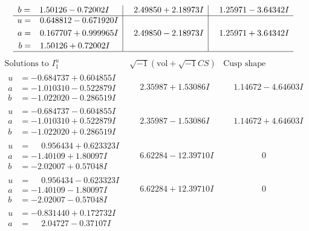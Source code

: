 \documentclass[1p]{elsarticle_modified}
\theoremstyle{definition}
\newcommand{\I}{\sqrt{-1}}
\begin{document}
$$\begin{array}{c|c|c}
\begin{aligned}
b &= \phantom{-}1.50126 - 0.72002 I\end{aligned}
 & \phantom{-}2.49850 + 2.18973 I & \phantom{-}1.25971 - 3.64342 I \\ \hline\begin{aligned}
u &= \phantom{-}0.648812 - 0.671920 I \\
a &= \phantom{-}0.167707 + 0.999965 I \\
b &= \phantom{-}1.50126 + 0.72002 I\end{aligned}
 & \phantom{-}2.49850 - 2.18973 I & \phantom{-}1.25971 + 3.64342 I\\
 \hline 
 \end{array}$$\newpage$$\begin{array}{c|c|c}  
\text{Solutions to }I^u_{1}& \I (\text{vol} + \sqrt{-1}CS) & \text{Cusp shape}\\
 \hline 
\begin{aligned}
u &= -0.684737 + 0.604855 I \\
a &= -1.010310 - 0.522879 I \\
b &= -1.022020 - 0.286519 I\end{aligned}
 & \phantom{-}2.35987 + 1.53086 I & \phantom{-}1.14672 - 4.64603 I \\ \hline\begin{aligned}
u &= -0.684737 - 0.604855 I \\
a &= -1.010310 + 0.522879 I \\
b &= -1.022020 + 0.286519 I\end{aligned}
 & \phantom{-}2.35987 - 1.53086 I & \phantom{-}1.14672 + 4.64603 I \\ \hline\begin{aligned}
u &= \phantom{-}0.956434 + 0.623323 I \\
a &= -1.40109 + 1.80097 I \\
b &= -2.02007 + 0.57048 I\end{aligned}
 & \phantom{-}6.62284 - 12.39710 I & \phantom{-0.000000 } 0 \\ \hline\begin{aligned}
u &= \phantom{-}0.956434 - 0.623323 I \\
a &= -1.40109 - 1.80097 I \\
b &= -2.02007 - 0.57048 I\end{aligned}
 & \phantom{-}6.62284 + 12.39710 I & \phantom{-0.000000 } 0 \\ \hline\begin{aligned}
u &= -0.831440 + 0.172732 I \\
a &= \phantom{-}2.04727 - 0.37107 I \\

\end{aligned}
\end{array}$$
\end{document}
